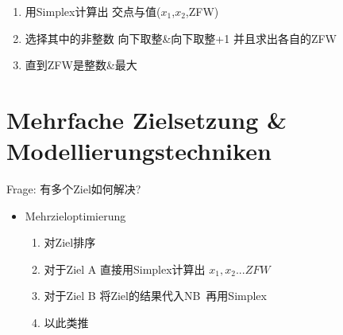 \documentclass[12pt, letterpaper]{article}
\begin{document}
\begin{CJK*}{UTF8}{gbsn}
\begin{itemize}
\begin{enumerate}
\item 用Simplex计算出 交点与值($x_1$,$x_2$,ZFW)
\item 选择其中的非整数 向下取整\&向下取整+1 并且求出各自的ZFW
\item 直到ZFW是整数\&最大 

\end{enumerate}
\end{itemize}


\newpage
\section{Mehrfache Zielsetzung \& Modellierungstechniken}
Frage: 有多个Ziel如何解决?

\begin{itemize}
\item Mehrzieloptimierung

\begin{enumerate}
\item 对Ziel排序
\item 对于Ziel A 直接用Simplex计算出 $x_1, x_2...ZFW$
\item 对于Ziel B 将Ziel的结果代入NB\ 再用Simplex
\item 以此类推



\end{enumerate}
\end{itemize}



\end{CJK*}
\end{document}
